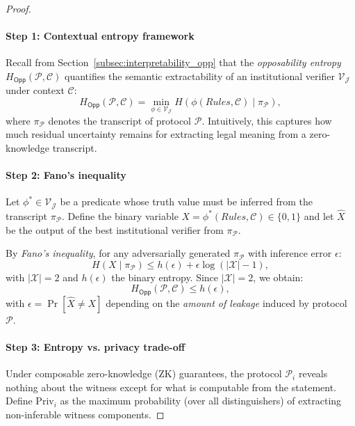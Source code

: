 \documentclass[preprint,12pt]{elsarticle}
\begin{document}
                \begin{proof}
                    \paragraph{Step 1: Contextual entropy framework}
                    Recall from Section~\ref{subsec:interpretability_opp} that the \emph{opposability entropy} $H_{\mathsf{Opp}}(\mathcal{P}, \mathcal{C})$ quantifies the semantic extractability of an institutional verifier $\mathcal{V}_{\mathcal{J}}$ under context $\mathcal{C}$:
                    \[
                        H_{\mathsf{Opp}}(\mathcal{P}, \mathcal{C}) = \min_{\phi \in \mathcal{V}_{\mathcal{J}}} H\left(\phi(Rules, \mathcal{C}) \mid \pi_\mathcal{P}\right),
                    \]
                    where $\pi_\mathcal{P}$ denotes the transcript of protocol $\mathcal{P}$. Intuitively, this captures how much residual uncertainty remains for extracting legal meaning from a zero-knowledge transcript.

                    \paragraph{Step 2: Fano's inequality}
                    Let $\phi^* \in \mathcal{V}_{\mathcal{J}}$ be a predicate whose truth value must be inferred from the transcript $\pi_\mathcal{P}$. Define the binary variable $X = \phi^*(Rules, \mathcal{C}) \in \{0,1\}$ and let $\hat{X}$ be the output of the best institutional verifier from $\pi_\mathcal{P}$.

                    By \emph{Fano’s inequality}, for any adversarially generated $\pi_\mathcal{P}$ with inference error $\epsilon$:
                    \[
                        H(X \mid \pi_\mathcal{P}) \leq h(\epsilon) + \epsilon \log(|\mathcal{X}| - 1),
                    \]
                        with $|\mathcal{X}| = 2$ and $h(\epsilon)$ the binary entropy. Since $|\mathcal{X}| = 2$, we obtain:
                    \[
                        H_{\mathsf{Opp}}(\mathcal{P}, \mathcal{C}) \leq h(\epsilon),
                    \]
                    with $\epsilon = \Pr[\hat{X} \neq X]$ depending on the \emph{amount of leakage} induced by protocol $\mathcal{P}$.

                    \paragraph{Step 3: Entropy vs. privacy trade-off}
                    Under composable zero-knowledge (ZK) guarantees, the protocol $\mathcal{P}_i$ reveals nothing about the witness except for what is computable from the statement. Define $\mathrm{Priv}_i$ as the maximum probability (over all distinguishers) of extracting non-inferable witness components.


\end{proof}
\end{document}
